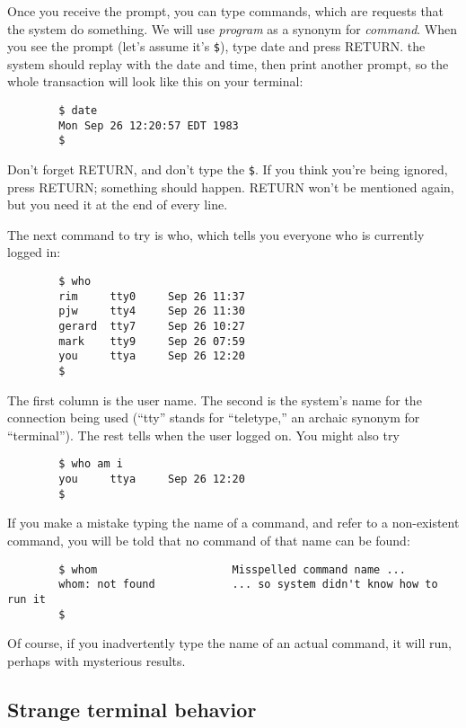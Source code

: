 Once you receive the prompt, you can type commands, which are requests that the
system do something. We will use \textit{program} as a synonym for
\textit{command}. When you see the prompt (let's assume it's \verb=$=), type
date and press RETURN. the system should replay with the date and time, then
print another prompt, so the whole transaction will look like this on your
terminal:
\begin{verbatim}
        $ date
        Mon Sep 26 12:20:57 EDT 1983
        $
\end{verbatim}
Don't forget RETURN, and don't type the \verb=$=. If you think you're being
ignored, press RETURN; something should happen. RETURN won't be mentioned again,
but you need it at the end of every line.

The next command to try is who, which tells you everyone who is currently logged
in:
\begin{verbatim}
        $ who
        rim     tty0     Sep 26 11:37
        pjw     tty4     Sep 26 11:30
        gerard  tty7     Sep 26 10:27
        mark    tty9     Sep 26 07:59
        you     ttya     Sep 26 12:20
        $
\end{verbatim}
The first column is the user name. The second is the system's name for the
connection being used (``tty'' stands for ``teletype,'' an archaic synonym for
``terminal''). The rest tells when the user logged on. You might also try
\begin{verbatim}
        $ who am i
        you     ttya     Sep 26 12:20
        $
\end{verbatim}

If you make a mistake typing the name of a command, and refer to a non-existent
command, you will be told that no command of that name can be found:
\begin{verbatim}
        $ whom                     Misspelled command name ...    
        whom: not found            ... so system didn't know how to run it
        $
\end{verbatim}
Of course, if you inadvertently type the name of an actual command, it will run,
perhaps with mysterious results.


\subsection{Strange terminal behavior}


